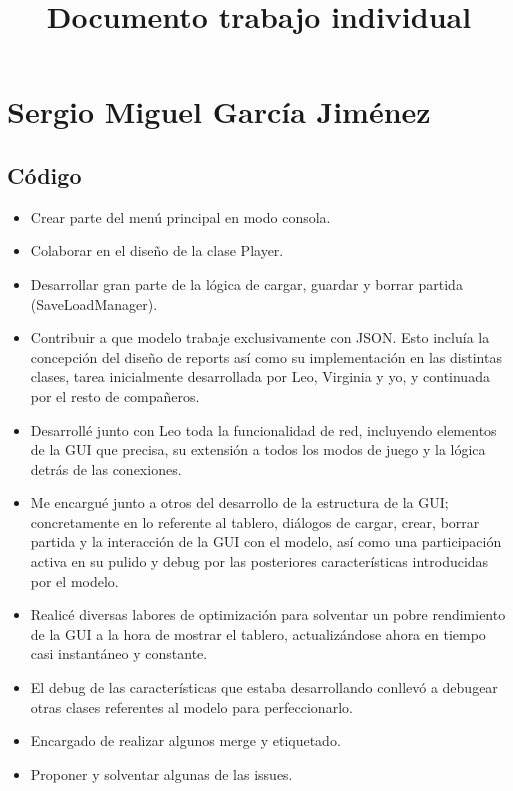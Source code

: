 \documentclass{article}
\begin{document}
\title{Documento trabajo individual}
\maketitle
\section*{Sergio Miguel García Jiménez}
\subsection*{Código}

\begin{itemize}
\item Crear parte del menú principal en modo consola.
\item Colaborar en el diseño de la clase Player.
\item Desarrollar gran parte de la lógica de cargar, guardar y borrar partida (SaveLoadManager).
\item Contribuir a que modelo trabaje exclusivamente con JSON. Esto incluía la concepción del diseño de reports así como su implementación en las distintas clases, tarea inicialmente desarrollada por Leo, Virginia y yo, y continuada por el resto de compañeros.
\item Desarrollé junto con Leo toda la funcionalidad de red, incluyendo elementos de la GUI que precisa, su extensión a todos los modos de juego y la lógica detrás de las conexiones.
\item Me encargué junto a otros del desarrollo de la estructura de la GUI; concretamente en lo referente al tablero, diálogos de cargar, crear, borrar partida y la interacción de la GUI con el modelo, así como una participación activa en su pulido y debug por las posteriores características introducidas por el modelo.
\item Realicé diversas labores de optimización para solventar un pobre rendimiento de la GUI a la hora de mostrar el tablero, actualizándose ahora en tiempo casi instantáneo y constante.
\item El debug de las características que estaba desarrollando conllevó a debugear otras clases referentes al modelo para perfeccionarlo.
\item Encargado de realizar algunos merge y etiquetado.
\item Proponer y solventar algunas de las issues.
\end{itemize}
\end{document}

